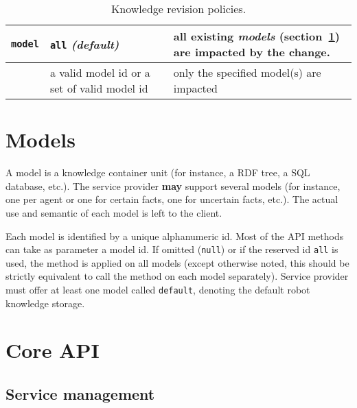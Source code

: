 \begin{table}
\begin{center}
\begin{tabular}{lp{4cm}p{9cm}}
    \midrule
    
    {\tt model} & {\tt all} \emph{(default)} & all existing \emph{models}
    (section~\ref{sect|kbapi-models}) are impacted by the change.\\

    \midrule
    
    & a valid model id or a set of valid model id & only the specified model(s)
    are impacted\\
    
    \bottomrule
    
    \end{tabular}

\end{center}
\caption{Knowledge revision policies.}
\label{table|complete-knowledge-policies}
\end{table}


\section{Models}
\label{sect|kbapi-models}

A model is a knowledge container unit (for instance, a RDF tree, a SQL
database, etc.). The service provider \textbf{may} support several models
(for instance, one per agent or one for certain facts, one for uncertain facts,
etc.). The actual use and semantic of each model is left to the client.

Each model is identified by a unique alphanumeric id. Most of
the API methods can take as parameter a model id. If omitted ({\tt null}) or
if the reserved id {\tt all} is used, the method is applied on all models
(except otherwise noted, this should be strictly equivalent to call the method
on each model separately). Service provider must offer at least one model
called {\tt default}, denoting the default robot knowledge storage.


\section{Core API}

\subsection{Service management}

